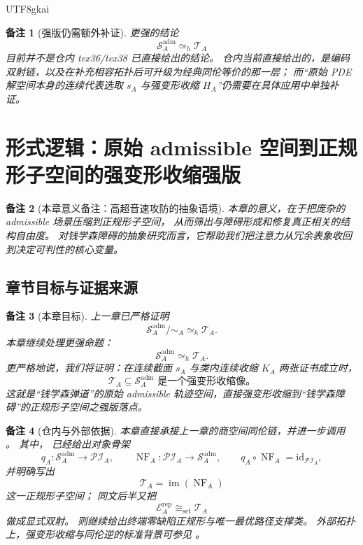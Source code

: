 \documentclass[12pt]{article}
\newtheorem{remark}{备注}[section]
\newcommand{\id}{\mathrm{id}}
\begin{document}
\begin{CJK*}{UTF8}{gkai}
\begin{remark}[强版仍需额外补证]
更强的结论
\[
  \mathcal S_A^{\mathrm{adm}}
  \simeq_h
  \mathcal T_A
\]
目前并不是仓内 tex36/tex38 已直接给出的结论。
仓内当前直接给出的，是编码双射链，以及在补充相容拓扑后可升级为经典同伦等价的那一层；
而“原始 PDE 解空间本身的连续代表选取 \(s_A\) 与强变形收缩 \(H_A\)”仍需要在具体应用中单独补证。
\end{remark}

\clearpage
\section{形式逻辑：原始 admissible 空间到正规形子空间的强变形收缩强版}
\label{sec:tex1-ch8}

\begin{remark}[本章意义备注：高超音速攻防的抽象语境]
本章的意义，在于把庞杂的 admissible 场景压缩到正规形子空间，
从而筛出与障碍形成和修复真正相关的结构自由度。
对钱学森障碍的抽象研究而言，它帮助我们把注意力从冗余表象收回到决定可判性的核心变量。
\end{remark}

\subsection{章节目标与证据来源}
\label{subsec:tex1-ch8-goal}

\begin{remark}[本章目标]
上一章已严格证明
\[
  \mathcal S_A^{\mathrm{adm}}/\sim_A
  \simeq_h
  \mathcal T_A.
\]
本章继续处理更强命题：
\[
  \boxed{
    \mathcal S_A^{\mathrm{adm}}
    \simeq_h
    \mathcal T_A
  }.
\]
更严格地说，我们将证明：在连续截面 \(s_A\) 与类内连续收缩 \(K_A\) 两张证书成立时，
\[
  \boxed{
    \mathcal T_A\subseteq \mathcal S_A^{\mathrm{adm}}
    \text{ 是一个强变形收缩像。}
  }
\]
这就是“钱学森弹道”的原始 admissible 轨迹空间，直接强变形收缩到“钱学森障碍”的正规形子空间之强版落点。
\end{remark}

\begin{remark}[仓内与外部依据]
本章直接承接上一章的商空间同伦链，并进一步调用
\cite{RepoTex36HomotopyTwistEquivalence,RepoTex38JacobiBianchiRepair}。
其中，
\cite{RepoTex36HomotopyTwistEquivalence}
已经给出对象骨架
\[
  q_A:\mathcal S_A^{\mathrm{adm}}\to \mathcal{PI}_A,
  \qquad
  \operatorname{NF}_A:\mathcal{PI}_A\to \mathcal S_A^{\mathrm{adm}},
  \qquad
  q_A\circ \operatorname{NF}_A=\id_{\mathcal{PI}_A},
\]
并明确写出
\[
  \mathcal T_A=\operatorname{im}(\operatorname{NF}_A)
\]
这一正规形子空间；
同文后半又把
\[
  \mathcal E_A^{\mathrm{rep}}
  \cong_{\mathrm{set}}
  \mathcal T_A
\]
做成显式双射。
\cite{RepoTex38JacobiBianchiRepair}
则继续给出终端零缺陷正规形与唯一最优路径支撑类。
外部拓扑上，强变形收缩与同伦逆的标准背景可参见 \cite{Hatcher2002AT}。
\end{remark}


\end{CJK*}
\end{document}
